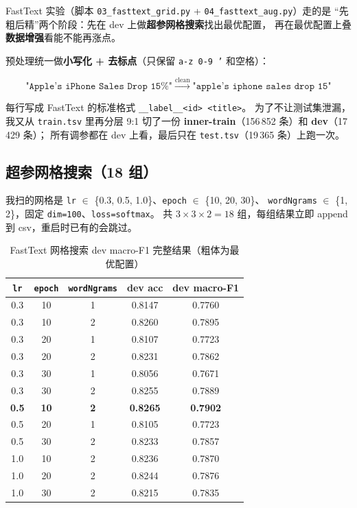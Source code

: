 \documentclass{SYSUReport}
\begin{document}
FastText 实验（脚本 \verb|03_fasttext_grid.py| + \verb|04_fasttext_aug.py|）走的是
“先粗后精”两个阶段：先在 dev 上做\textbf{超参网格搜索}找出最优配置，
再在最优配置上叠\textbf{数据增强}看能不能再涨点。

预处理统一做\textbf{小写化 + 去标点}（只保留 \texttt{a-z 0-9 '} 和空格）：

\begin{equation}
\texttt{"Apple's iPhone Sales Drop 15\%"}
\;\xrightarrow{\text{clean}}\;
\texttt{"apple's iphone sales drop 15"}
\end{equation}

每行写成 FastText 的标准格式 \texttt{\_\_label\_\_<id> <title>}。
为了不让测试集泄漏，我又从 \texttt{train.tsv} 里再分层 9:1 切了一份
\textbf{inner-train}（156\,852 条）和 \textbf{dev}（17\,429 条）；
所有调参都在 dev 上看，最后只在 \texttt{test.tsv}（19\,365 条）上跑一次。

\subsection{超参网格搜索（18 组）}

我扫的网格是 \texttt{lr} $\in$ \{0.3, 0.5, 1.0\}、\texttt{epoch} $\in$ \{10, 20, 30\}、
\texttt{wordNgrams} $\in$ \{1, 2\}，固定 \texttt{dim=100}、\texttt{loss=softmax}。
共 $3 \times 3 \times 2 = 18$ 组，每组结果立即 append 到 csv，重启时已有的会跳过。

\begin{table}[!htbp]
\centering
\caption{FastText 网格搜索 dev macro-F1 完整结果（粗体为最优配置）}
\label{tab:ft-grid}
\begin{tabular}{ccccc}
\toprule
\texttt{lr} & \texttt{epoch} & \texttt{wordNgrams} & dev acc & dev macro-F1 \\
\midrule
0.3 & 10 & 1 & 0.8147 & 0.7760 \\
0.3 & 10 & 2 & 0.8260 & 0.7895 \\
0.3 & 20 & 1 & 0.8107 & 0.7723 \\
0.3 & 20 & 2 & 0.8231 & 0.7862 \\
0.3 & 30 & 1 & 0.8056 & 0.7671 \\
0.3 & 30 & 2 & 0.8255 & 0.7889 \\
\textbf{0.5} & \textbf{10} & \textbf{2} & \textbf{0.8265} & \textbf{0.7902} \\
0.5 & 20 & 1 & 0.8105 & 0.7723 \\
0.5 & 30 & 2 & 0.8233 & 0.7857 \\
1.0 & 10 & 2 & 0.8236 & 0.7870 \\
1.0 & 20 & 2 & 0.8244 & 0.7876 \\
1.0 & 30 & 2 & 0.8215 & 0.7835 \\
\bottomrule
\end{tabular}
\end{table}
\end{document}
